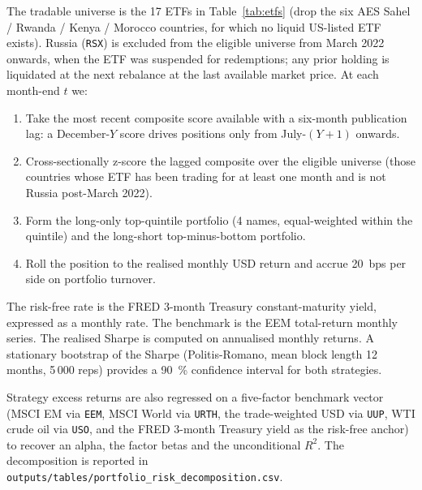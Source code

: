 The tradable universe is the 17 ETFs in Table~\ref{tab:etfs} (drop the six AES Sahel / Rwanda / Kenya / Morocco countries, for which no liquid US-listed ETF exists). Russia (\texttt{RSX}) is excluded from the eligible universe from March 2022 onwards, when the ETF was suspended for redemptions; any prior holding is liquidated at the next rebalance at the last available market price. At each month-end $t$ we:
\begin{enumerate}\setlength{\itemsep}{0.1em}
  \item Take the most recent composite score available with a six-month publication lag: a December-$Y$ score drives positions only from July-$(Y+1)$ onwards.
  \item Cross-sectionally z-score the lagged composite over the eligible universe (those countries whose ETF has been trading for at least one month and is not Russia post-March 2022).
  \item Form the long-only top-quintile portfolio (4 names, equal-weighted within the quintile) and the long-short top-minus-bottom portfolio.
  \item Roll the position to the realised monthly USD return and accrue 20~bps per side on portfolio turnover.
\end{enumerate}
The risk-free rate is the FRED 3-month Treasury constant-maturity yield, expressed as a monthly rate. The benchmark is the EEM total-return monthly series. The realised Sharpe is computed on annualised monthly returns. A stationary bootstrap of the Sharpe (Politis-Romano, mean block length 12 months, 5\,000 reps) provides a 90~\% confidence interval for both strategies.

Strategy excess returns are also regressed on a five-factor benchmark vector (MSCI EM via \texttt{EEM}, MSCI World via \texttt{URTH}, the trade-weighted USD via \texttt{UUP}, WTI crude oil via \texttt{USO}, and the FRED 3-month Treasury yield as the risk-free anchor) to recover an alpha, the factor betas and the unconditional $R^2$. The decomposition is reported in \texttt{outputs/tables/portfolio\_risk\_decomposition.csv}.

